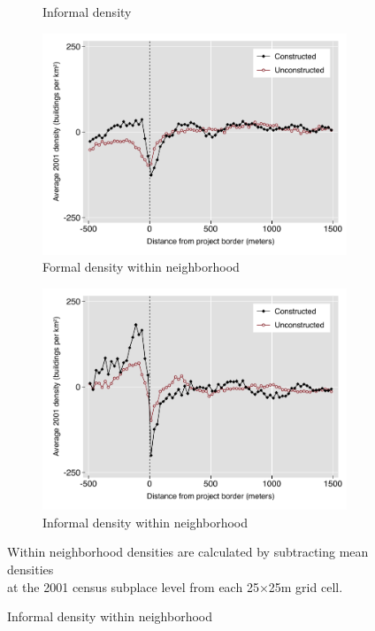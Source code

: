 \documentclass[12pt]{article}
\begin{document}
\begin{figure}[h!]
\begin{subfigure}[b]{0.495\textwidth}
            \caption[]%
            {{\small Informal density}}    
            \label{fig:preinf_raw}
        \end{subfigure}
        \begin{subfigure}[b]{0.495\textwidth}
            \centering
            \includegraphics[width=\textwidth,trim={0.3cm .3cm 0.1cm 0cm}, clip=true]{figures/bblu_for_fe_pre_means_4_spk.pdf}
            \caption[Network2]%
            {{\small Formal density within neighborhood}}    
            \label{fig:prefor_fe}
        \end{subfigure}
        \hfill
        \begin{subfigure}[b]{0.495\textwidth}  
            \centering 
            \includegraphics[width=\textwidth,trim={0.3cm .3cm 0.1cm 0cm}, clip=true]{figures/bblu_inf_fe_pre_means_4_spk.pdf}
            \caption[]%
            {{\small Informal density within neighborhood}}    
            \label{fig:preinf_fe}
        \end{subfigure}
        \label{fig:rawbblumeans_het}
   {\scriptsize Within neighborhood densities are calculated by subtracting mean densities  \\[-.5em] at the 2001 census subplace level from each 25$\times$25m grid cell.}
    \end{figure} 
\end{document}

